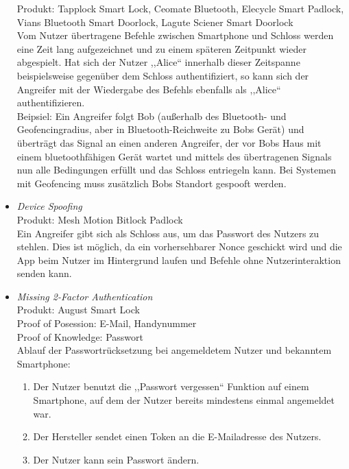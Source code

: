 \begin{itemize}[leftmargin=0cm,label={}]
                Produkt: Tapplock Smart Lock, Ceomate Bluetooth, Elecycle Smart Padlock, Vians Bluetooth Smart Doorlock, Lagute Sciener Smart Doorlock\\
                Vom Nutzer übertragene Befehle zwischen Smartphone und Schloss werden eine Zeit lang aufgezeichnet und zu einem späteren Zeitpunkt wieder abgespielt. 
                Hat sich der Nutzer ,,Alice`` innerhalb dieser Zeitspanne beispielsweise gegenüber dem Schloss authentifiziert, so kann sich der Angreifer mit der Wiedergabe des Befehls ebenfalls als ,,Alice`` authentifizieren.\\ 
                Beipsiel: Ein Angreifer folgt Bob (außerhalb des Bluetooth- und Geofencingradius, aber in Bluetooth-Reichweite zu Bobs Gerät) und überträgt das Signal an einen anderen Angreifer, der vor Bobs Haus mit einem bluetoothfähigen Gerät wartet und mittels des übertragenen Signals nun alle Bedingungen erfüllt und das Schloss entriegeln kann.
                Bei Systemen mit Geofencing muss zusätzlich Bobs Standort gespooft werden.
            \item \emph{Device Spoofing}\cite{Rose2016}\label{vuln:spoofing}\\
                Produkt: Mesh Motion Bitlock Padlock\\
                Ein Angreifer gibt sich als Schloss aus, um das Passwort des Nutzers zu stehlen. 
                Dies ist möglich, da ein vorhersehbarer Nonce geschickt wird und die App beim Nutzer im Hintergrund laufen und Befehle ohne Nutzerinteraktion senden kann.
	        \item \emph{Missing 2-Factor Authentication}\cite{Jmaxxz2015}\label{vuln:2factor}\\
                Produkt: August Smart Lock\\
                Proof of Posession: E-Mail, Handynummer\\
                Proof of Knowledge: Passwort\\
                Ablauf der Passwortrücksetzung bei angemeldetem Nutzer und bekanntem Smartphone:
                \begin{enumerate}[noitemsep]
                    \item Der Nutzer benutzt die ,,Passwort vergessen`` Funktion auf einem Smartphone, auf dem der Nutzer bereits mindestens einmal angemeldet war.
                    \item Der Hersteller sendet einen Token an die E-Mailadresse des Nutzers.
                    \item Der Nutzer kann sein Passwort ändern.

\end{enumerate}
\end{itemize}
